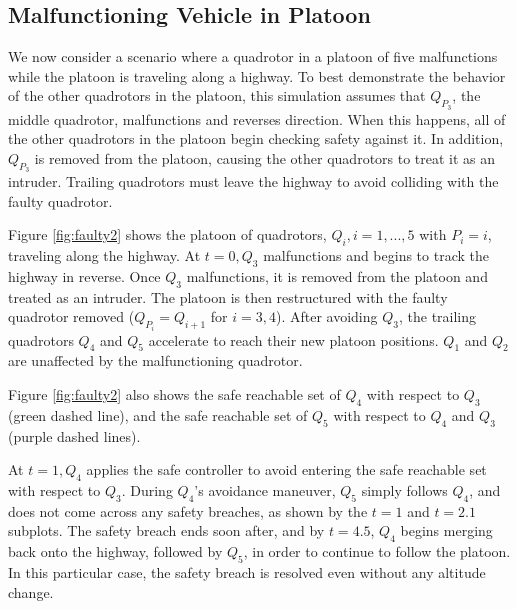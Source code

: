 \subsection{Malfunctioning Vehicle in Platoon}
We now consider a scenario where a quadrotor in a platoon of five malfunctions while the platoon is traveling along a highway. To best demonstrate the behavior of the other quadrotors in the platoon, this simulation assumes that $Q_{P_3}$, the middle quadrotor, malfunctions and reverses direction. When this happens, all of the other quadrotors in the platoon begin checking safety against it. In addition, $Q_{P_3}$ is removed from the platoon, causing the other quadrotors to treat it as an intruder.  Trailing quadrotors must leave the highway to avoid colliding with the faulty quadrotor. 

Figure \ref{fig:faulty2} shows the platoon of quadrotors, $Q_i,i = 1,...,5$ with $P_i = i$, traveling along the highway. At $t=0, Q_3$ malfunctions and begins to track the highway in reverse. Once $Q_3$ malfunctions, it is removed from the platoon and treated as an intruder. The platoon is then restructured with the faulty quadrotor removed ($Q_{P_i} = Q_{i+1}$ for $i=3,4$). After avoiding $Q_3$, the trailing quadrotors $Q_4$ and $Q_5$ accelerate to reach their new platoon positions. $Q_1$ and $Q_2$ are unaffected by the malfunctioning quadrotor. 

Figure \ref{fig:faulty2} also shows the safe reachable set of $Q_4$ with respect to $Q_3$ (green dashed line), and the safe reachable set of $Q_5$ with respect to $Q_4$ and $Q_3$ (purple dashed lines).

At $t=1,Q_4$ applies the safe controller to avoid entering the safe reachable set with respect to $Q_3$. During $Q_4$'s avoidance maneuver, $Q_5$ simply follows $Q_4$, and does not come across any safety breaches, as shown by the $t=1$ and $t=2.1$ subplots. The safety breach ends soon after, and by $t=4.5$, $Q_4$ begins merging back onto the highway, followed by $Q_5$, in order to continue to follow the platoon. In this particular case, the safety breach is resolved even without any altitude change.



